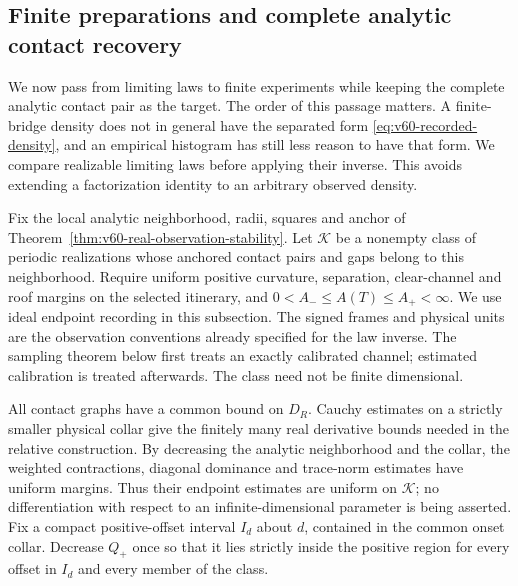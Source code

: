 \subsection{Finite preparations and complete analytic contact recovery}
\label{subsec:v62-finite-experiment}

We now pass from limiting laws to finite experiments while keeping the
complete analytic contact pair as the target.  The order of this passage
matters.  A finite-bridge density does not in general have the separated
form \eqref{eq:v60-recorded-density}, and an empirical histogram has still
less reason to have that form.  We compare realizable limiting laws before
applying their inverse.  This avoids extending a factorization identity to
an arbitrary observed density.

Fix the local analytic neighborhood, radii, squares and anchor of
Theorem~\ref{thm:v60-real-observation-stability}.  Let $\mathcal K$ be a
nonempty class of periodic realizations whose anchored contact pairs and
gaps belong to this neighborhood.  Require uniform positive curvature,
separation, clear-channel and roof margins on the selected itinerary, and
$0<A_-\le A(T)\le A_+<\infty$.  We use ideal endpoint recording in this
subsection.  The signed frames and physical units are the observation
conventions already specified for the law inverse.  The sampling theorem
below first treats an exactly calibrated channel; estimated calibration
is treated afterwards.  The class need not be finite dimensional.

All contact graphs have a common bound on $D_R$.  Cauchy estimates on a
strictly smaller physical collar give the finitely many real derivative
bounds needed in the relative construction.  By decreasing the analytic
neighborhood and the collar, the weighted contractions, diagonal dominance
and trace-norm estimates have uniform margins.  Thus their endpoint
estimates are uniform on $\mathcal K$; no differentiation with respect to
an infinite-dimensional parameter is being asserted.  Fix a compact
positive-offset interval $I_d$ about $d$, contained in the common onset
collar.  Decrease $Q_+$ once so that it lies strictly inside the positive
region for every offset in $I_d$ and every member of the class.

